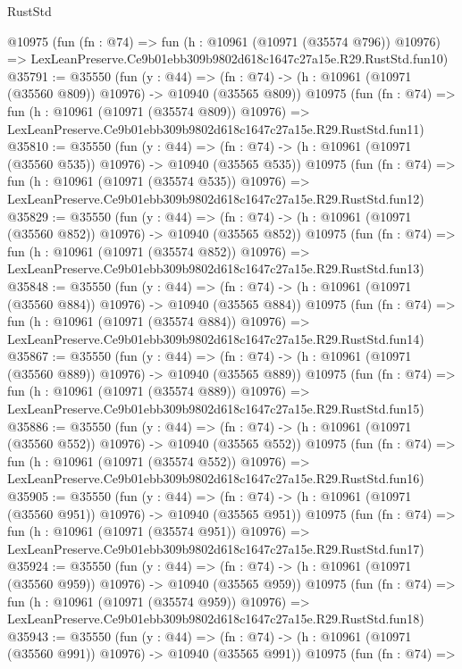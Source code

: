 \begin{lexlean}{RustStd}
\begin{coremodule}
    @10975
    (fun (fn : @74) =>
    fun (h : @10961 (@10971 (@35574 @796)) @10976) =>
    LexLeanPreserve.Ce9b01ebb309b9802d618c1647c27a15e.R29.RustStd.fun10)
@35791 := @35550
    (fun (y : @44) =>
    (fn : @74) -> (h : @10961 (@10971 (@35560 @809)) @10976) -> @10940 (@35565 @809))
    @10975
    (fun (fn : @74) =>
    fun (h : @10961 (@10971 (@35574 @809)) @10976) =>
    LexLeanPreserve.Ce9b01ebb309b9802d618c1647c27a15e.R29.RustStd.fun11)
@35810 := @35550
    (fun (y : @44) =>
    (fn : @74) -> (h : @10961 (@10971 (@35560 @535)) @10976) -> @10940 (@35565 @535))
    @10975
    (fun (fn : @74) =>
    fun (h : @10961 (@10971 (@35574 @535)) @10976) =>
    LexLeanPreserve.Ce9b01ebb309b9802d618c1647c27a15e.R29.RustStd.fun12)
@35829 := @35550
    (fun (y : @44) =>
    (fn : @74) -> (h : @10961 (@10971 (@35560 @852)) @10976) -> @10940 (@35565 @852))
    @10975
    (fun (fn : @74) =>
    fun (h : @10961 (@10971 (@35574 @852)) @10976) =>
    LexLeanPreserve.Ce9b01ebb309b9802d618c1647c27a15e.R29.RustStd.fun13)
@35848 := @35550
    (fun (y : @44) =>
    (fn : @74) -> (h : @10961 (@10971 (@35560 @884)) @10976) -> @10940 (@35565 @884))
    @10975
    (fun (fn : @74) =>
    fun (h : @10961 (@10971 (@35574 @884)) @10976) =>
    LexLeanPreserve.Ce9b01ebb309b9802d618c1647c27a15e.R29.RustStd.fun14)
@35867 := @35550
    (fun (y : @44) =>
    (fn : @74) -> (h : @10961 (@10971 (@35560 @889)) @10976) -> @10940 (@35565 @889))
    @10975
    (fun (fn : @74) =>
    fun (h : @10961 (@10971 (@35574 @889)) @10976) =>
    LexLeanPreserve.Ce9b01ebb309b9802d618c1647c27a15e.R29.RustStd.fun15)
@35886 := @35550
    (fun (y : @44) =>
    (fn : @74) -> (h : @10961 (@10971 (@35560 @552)) @10976) -> @10940 (@35565 @552))
    @10975
    (fun (fn : @74) =>
    fun (h : @10961 (@10971 (@35574 @552)) @10976) =>
    LexLeanPreserve.Ce9b01ebb309b9802d618c1647c27a15e.R29.RustStd.fun16)
@35905 := @35550
    (fun (y : @44) =>
    (fn : @74) -> (h : @10961 (@10971 (@35560 @951)) @10976) -> @10940 (@35565 @951))
    @10975
    (fun (fn : @74) =>
    fun (h : @10961 (@10971 (@35574 @951)) @10976) =>
    LexLeanPreserve.Ce9b01ebb309b9802d618c1647c27a15e.R29.RustStd.fun17)
@35924 := @35550
    (fun (y : @44) =>
    (fn : @74) -> (h : @10961 (@10971 (@35560 @959)) @10976) -> @10940 (@35565 @959))
    @10975
    (fun (fn : @74) =>
    fun (h : @10961 (@10971 (@35574 @959)) @10976) =>
    LexLeanPreserve.Ce9b01ebb309b9802d618c1647c27a15e.R29.RustStd.fun18)
@35943 := @35550
    (fun (y : @44) =>
    (fn : @74) -> (h : @10961 (@10971 (@35560 @991)) @10976) -> @10940 (@35565 @991))
    @10975
    (fun (fn : @74) =>

\end{coremodule}
\end{lexlean}
